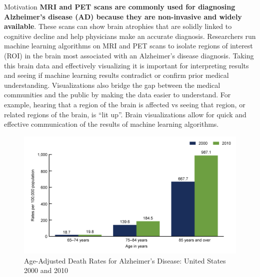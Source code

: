\documentclass[final]{beamer}
\newlength{\onecolwid}
\begin{document}
\begin{frame}[t]
\begin{columns}[t]
\begin{column}{\onecolwid}
\begin{alertblock}{Motivation}
            \textbf{MRI and PET scans are commonly used for diagnosing Alzheimer’s disease (AD) because they are non-invasive and widely available}. These scans can show brain atrophies that are solidly linked to cognitive decline and help physicians make an accurate diagnosis. Researchers run machine learning algorithms on MRI and PET scans to isolate regions of interest (ROI) in the brain most associated with an Alzheimer’s disease diagnosis. Taking this brain data and effectively visualizing it is important for interpreting results and seeing if machine learning results contradict or confirm prior medical understanding. Visualizations also bridge the gap between the medical communities and the public by making the data easier to understand. For example, hearing that a region of the brain is affected vs seeing that region, or related regions of the brain, is “lit up”. Brain visualizations allow for quick and effective communication of the results of machine learning algorithms.
            \vspace{2cm}
            \begin{figure}
                \includegraphics[width=1.0\textwidth,keepaspectratio]{images/alzRate.PNG}
                \vspace{1cm}
                \caption{Age-Adjusted Death Rates for Alzheimer's Disease: United States 2000 and 2010}\label{imageLabel}
           \end{figure}
           \vspace{1cm}
        
        \end{alertblock}
        
        

        

\end{column}
\end{columns}
\end{frame}
\end{document}
